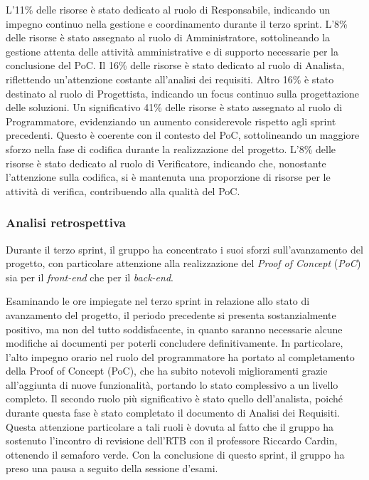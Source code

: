 L'11\% delle risorse è stato dedicato al ruolo di Responsabile, indicando un impegno continuo nella gestione e coordinamento durante il terzo sprint.
L'8\% delle risorse è stato assegnato al ruolo di Amministratore, sottolineando la gestione attenta delle attività amministrative e di supporto necessarie per la conclusione del PoC.
Il 16\% delle risorse è stato dedicato al ruolo di Analista, riflettendo un'attenzione costante all'analisi dei requisiti.
Altro 16\% è stato destinato al ruolo di Progettista, indicando un focus continuo sulla progettazione delle soluzioni.
Un significativo 41\% delle risorse è stato assegnato al ruolo di Programmatore, evidenziando un aumento considerevole rispetto agli sprint precedenti. 
Questo è coerente con il contesto del PoC, sottolineando un maggiore sforzo nella fase di codifica durante la realizzazione del progetto.
L'8\% delle risorse è stato dedicato al ruolo di Verificatore, indicando che, nonostante l'attenzione sulla codifica, si è mantenuta una proporzione di risorse per le attività di verifica, contribuendo alla qualità del PoC.

\subsubsection{Analisi retrospettiva}

Durante il terzo sprint, il gruppo ha concentrato i suoi sforzi sull'avanzamento del progetto, con particolare attenzione alla realizzazione del \textit{Proof of Concept} 
(\textit{PoC}) sia per il \textit{front-end} che per il \textit{back-end}.

Esaminando le ore impiegate nel terzo sprint in relazione allo stato di avanzamento del progetto, il periodo precedente si presenta sostanzialmente positivo, ma 
non del tutto soddisfacente, in quanto saranno necessarie alcune modifiche ai documenti per poterli concludere definitivamente. In particolare, l'alto impegno 
orario nel ruolo del programmatore ha portato al completamento della Proof of Concept (PoC), che ha subito notevoli miglioramenti grazie all'aggiunta di nuove funzionalità, portando lo stato 
complessivo a un livello completo. Il secondo ruolo più significativo è stato quello dell'analista, poiché durante questa fase è stato completato il documento di Analisi dei Requisiti.
Questa attenzione particolare a tali ruoli è dovuta al fatto che il gruppo ha sostenuto l'incontro di revisione dell'RTB con il professore Riccardo Cardin, ottenendo il semaforo verde.
Con la conclusione di questo sprint, il gruppo ha preso una pausa a seguito della sessione d'esami.

